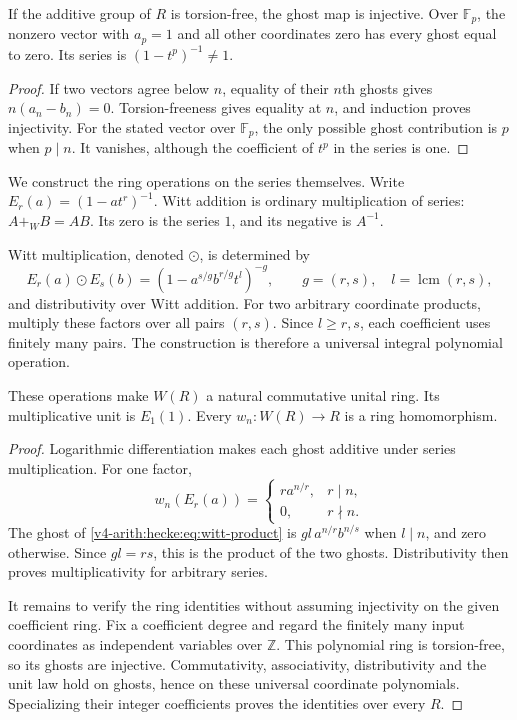 \begin{proposition}
\label{v4-arith:hecke:prop:ghosts}
If the additive group of $R$ is torsion-free, the ghost map is injective.
Over $\mathbb F_p$, the nonzero vector with $a_p=1$ and all other
coordinates zero has every ghost equal to zero.
Its series is $(1-t^p)^{-1}\ne1$.
\end{proposition}
\begin{proof}
If two vectors agree below $n$, equality of their $n$th ghosts gives
$n(a_n-b_n)=0$.
Torsion-freeness gives equality at $n$, and induction proves injectivity.
For the stated vector over $\mathbb F_p$, the only possible ghost
contribution is $p$ when $p\mid n$.
It vanishes, although the coefficient of $t^p$ in the series is one.
\end{proof}

We construct the ring operations on the series themselves.
Write $E_r(a)=(1-at^r)^{-1}$.
Witt addition is ordinary multiplication of series:
$A+_WB=AB$. Its zero is the series $1$, and its negative is $A^{-1}$.

Witt multiplication, denoted $\odot$, is determined by
\begin{equation}
 \label{v4-arith:hecke:eq:witt-product}
 E_r(a)\odot E_s(b)
 =\left(1-a^{s/g}b^{r/g}t^l\right)^{-g},
 \qquad g=(r,s),\quad l=\operatorname{lcm}(r,s),
\end{equation}
and distributivity over Witt addition.
For two arbitrary coordinate products, multiply these factors
over all pairs $(r,s)$.
Since $l\geq r,s$, each coefficient uses finitely many pairs.
The construction is therefore a universal integral polynomial operation.

\begin{theorem}
\label{v4-arith:hecke:thm:witt-ring}
These operations make $W(R)$ a natural commutative unital ring.
Its multiplicative unit is $E_1(1)$.
Every $w_n:W(R)\to R$ is a ring homomorphism.
\end{theorem}
\begin{proof}
Logarithmic differentiation makes each ghost additive under series multiplication.
For one factor,
\[
 w_n(E_r(a))=
 \begin{cases}r a^{n/r},&r\mid n,\\0,&r\nmid n.\end{cases}
\]
The ghost of \eqref{v4-arith:hecke:eq:witt-product} is
$gl\,a^{n/r}b^{n/s}$ when $l\mid n$, and zero otherwise.
Since $gl=rs$, this is the product of the two ghosts.
Distributivity then proves multiplicativity for arbitrary series.

It remains to verify the ring identities without assuming injectivity
on the given coefficient ring.
Fix a coefficient degree and regard the finitely many input coordinates
as independent variables over $\mathbb Z$.
This polynomial ring is torsion-free, so its ghosts are injective.
Commutativity, associativity, distributivity and the unit law hold on ghosts,
hence on these universal coordinate polynomials.
Specializing their integer coefficients proves the identities over every $R$.
\end{proof}

